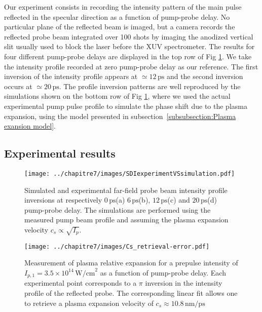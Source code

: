 \noindent Our experiment consists in recording the intensity pattern of the main pulse reflected in the specular direction as a function of pump-probe delay. No particular plane of the reflected beam is imaged, but a camera records the reflected probe beam integrated over 100 shots by imaging the anodized vertical slit usually used to block the laser before the XUV spectrometer. The results for four different pump-probe delays are displayed in the top row of Fig \ref{fig:SDIexperimentVSsimulation}. We take the intensity profile recorded at zero pump-probe delay as our reference. The first inversion of the intensity profile appears at $\simeq 12\,\mathrm{ps}$ and the second inversion occurs at
$\simeq 20\,\mathrm{ps}$. The profile inversion patterns are well reproduced by the simulations shown on the bottom row of Fig \ref{fig:SDIexperimentVSsimulation}, where we used the actual experimental pump pulse profile to simulate the phase shift due to the plasma expansion, using the model presented in subsection~\ref{subsubsection:Plasma exansion model}.


\subsection{Experimental results}

\begin{figure}[H]
\centering
\texttt{[image: ../chapitre7/images/SDIexperimentVSsimulation.pdf]}\\
\caption{\label{fig:SDIexperimentVSsimulation} Simulated and experimental far-field probe beam intensity profile inversions at respectively $0\,\mathrm{ps}$(a) $6\,\mathrm{ps}$(b), $12\,\mathrm{ps}$(c) and $20\,\mathrm{ps}$(d) pump-probe delay. The simulations are performed using the measured pump beam profile and assuming the plasma expansion velocity $c_s\propto \sqrt{I_p}$.}
\end{figure}

\begin{figure}[H]
\centering
\texttt{[image: ../chapitre7/images/Cs\_retrieval-error.pdf]}\\
\caption{\label{fig: Cs_retrieval-error}Measurement of plasma relative expansion for a prepulse intensity of $I_{p,1} = 3.5\times 10^{14}\,\mathrm{W/cm}^2$ as a function of pump-probe delay. Each experimental point corresponds to a $\pi$ inversion in the intensity profile of the reflected probe. The corresponding linear fit allows one to retrieve a plasma expansion velocity of $c_s\approx 10.8\,\mathrm{nm/ps}$}
\end{figure}

